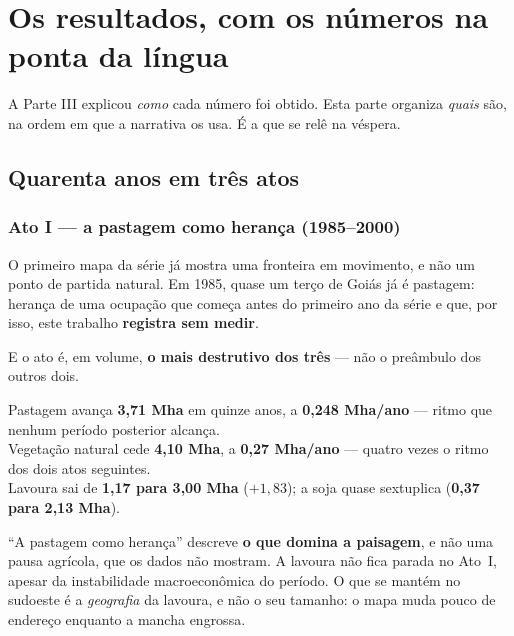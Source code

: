 \part{Os resultados, com os números na ponta da língua}

A Parte III explicou \emph{como} cada número foi obtido. Esta parte organiza
\emph{quais} são, na ordem em que a narrativa os usa. É a que se relê na
véspera.

\chapter{Quarenta anos em três atos}

\section{Ato I --- a pastagem como herança (1985--2000)}

O primeiro mapa da série já mostra uma fronteira em movimento, e não um ponto de
partida natural. Em 1985, quase um terço de Goiás já é pastagem: herança de uma
ocupação que começa antes do primeiro ano da série e que, por isso, este
trabalho \textbf{registra sem medir}.

E o ato é, em volume, \textbf{o mais destrutivo dos três} --- não o preâmbulo dos
outros dois.

\begin{ancora}
Pastagem avança \textbf{3,71 Mha} em quinze anos, a \textbf{0,248 Mha/ano} ---
ritmo que nenhum período posterior alcança. \\
Vegetação natural cede \textbf{4,10 Mha}, a \textbf{0,27 Mha/ano} --- quatro
vezes o ritmo dos dois atos seguintes. \\
Lavoura sai de \textbf{1,17 para 3,00 Mha} ($+1{,}83$); a soja quase sextuplica
(\textbf{0,37 para 2,13 Mha}).
\end{ancora}

\begin{armadilha}
``A pastagem como herança'' descreve \textbf{o que domina a paisagem}, e não uma
pausa agrícola, que os dados não mostram. A lavoura não fica parada no Ato~I,
apesar da instabilidade macroeconômica do período. O que se mantém no sudoeste é
a \emph{geografia} da lavoura, e não o seu tamanho: o mapa muda pouco de
endereço enquanto a mancha engrossa.
\end{armadilha}

